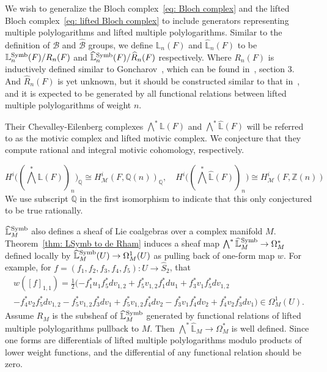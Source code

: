 We wish to generalize the Bloch complex~\eqref{eq: Bloch complex} and the lifted Bloch complex~\eqref{eq: lifted Bloch complex} to include generators representing multiple polylogarithms and lifted multiple polylogarithms. Similar to the definition of $\mathcal B$ and $\widehat{\mathcal B}$ groups, we define $\mathbb L_n(F)$ and $\widehat{\mathbb L}_n(F)$ to be $\mathbb L_n^{\operatorname{Symb}}(F)/R_n(F)$ and $\widehat{\mathbb L}_n^{\operatorname{Symb}}(F)/\widehat R_n(F)$ respectively. Where $R_n(F)$ is inductively defined similar to Goncharov~\cite{GoncharovMotivicGalois}, which can be found in~\cite{ZDHZ_TheLieCoalgebraOfMultiplePolylogarithms}, section 3. And $\widehat R_n(F)$ is yet unknown, but it should be constructed similar to that in~\cite{Zickert_HolomorphicPolylogarithmsAndBlochComplexes}, and it is expected to be generated by all functional relations between lifted multiple polylogarithms of weight $n$.

Their Chevalley-Eilenberg complexes $\bigwedge^*\mathbb L(F)$ and $\bigwedge^*\widehat{\mathbb L}(F)$ will be referred to as the motivic complex and lifted motivic complex. We conjecture that they compute rational and integral motivic cohomology, respectively.

\begin{conjecture}
\[
H^i\Big(\left(\textstyle\bigwedge^*\mathbb L(F)\right)_n\Big)_{\mathbb Q}\cong H_{\mathcal M}^i(F,\mathbb Q(n))_{\mathbb Q},\quad H^i\Big(\left(\textstyle\bigwedge^*\widehat{\mathbb L}(F)\right)_n\Big)\cong H_{\mathcal M}^i(F,\mathbb Z(n))
\]
We use subscript $\mathbb Q$ in the first isomorphism to indicate that this only conjectured to be true rationally.
\end{conjecture}

$\widehat{\mathbb L}^{\operatorname{Symb}}_M$ also defines a sheaf of Lie coalgebras over a complex manifold $M$. Theorem~\ref{thm: LSymb to de Rham} induces a sheaf map $\bigwedge^*\widehat{\mathbb L}^{\operatorname{Symb}}_M\to\Omega^*_M$ defined locally by $\widehat{\mathbb L}^{\operatorname{Symb}}_M(U)\to\Omega_M^1(U)$ as pulling back of one-form map $w$. For example, for $f=(f_1,f_2,f_3,f_4,f_5)\colon U\to \widehat S_2$, that
\begin{multline}
w([f]_{1,1})=\frac{1}{2}(-f_1^*u_1 f_5^*d v_{1,2}+ f_5^*v_{1,2}f_1^*d u_1+ f_3^*v_1 f_5^*d v_{1,2}\\-f_4^*v_2f_5^*d v_{1,2}-f_5^*v_{1,2}f_3^*d v_1+f_5^*v_{1,2}f_4^*d v_2-f_3^*v_1f_4^*d v_2+f_4^*v_2f_3^*d v_1)\in\Omega^1_M(U).
\end{multline}
Assume $R_M$ is the subsheaf of $\widehat{\mathbb L}^{\operatorname{Symb}}_M$ generated by functional relations of lifted multiple polylogarithms pullback to $M$. Then $\bigwedge^*\widehat{\mathbb L}_M\to\Omega^*_M$ is well defined. Since one forms are differentials of lifted multiple polylogarithms modulo products of lower weight functions, and the differential of any functional relation should be zero. 

